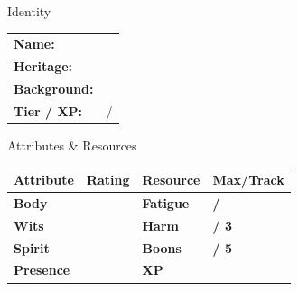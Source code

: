 \documentclass[10pt]{article}
\begin{document}
\begin{minipage}[t]{0.48\linewidth}
    \begin{charbox}{Identity}
        \begin{tabular}{p{2.5cm} p{5cm}}
            \textbf{Name:} & \underline{\hspace{4cm}} \\
            \textbf{Heritage:} & \underline{\hspace{4cm}} \\
            \textbf{Background:} & \underline{\hspace{4cm}} \\
            \textbf{Tier / XP:} & \underline{\hspace{2cm}} / \underline{\hspace{2cm}} \\
        \end{tabular}
    \end{charbox}
    
    \vspace{0.5em}
    
    \begin{charbox}{Attributes \& Resources}
        \begin{tabular}{>{\bfseries}p{2.5cm} >{\bfseries}p{1.5cm} >{\bfseries}p{2.5cm} >{\bfseries}p{1.5cm}}
            \toprule
            \textbf{Attribute} & \textbf{Rating} & \textbf{Resource} & \textbf{Max/Track} \\
            \midrule
            Body & \underline{\hspace{1.5cm}} & Fatigue & \underline{\hspace{1.5cm}} / \underline{\hspace{1.5cm}} \\
            Wits & \underline{\hspace{1.5cm}} & Harm & \underline{\hspace{1.5cm}} / 3 \\
            Spirit & \underline{\hspace{1.5cm}} & Boons & \underline{\hspace{1.5cm}} / 5 \\
            Presence & \underline{\hspace{1.5cm}} & XP & \underline{\hspace{1.5cm}} \\
            \bottomrule
        \end{tabular}
    \end{charbox}
    

\end{minipage}
\end{document}
